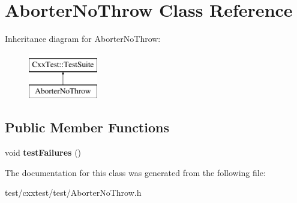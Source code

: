 \hypertarget{classAborterNoThrow}{\section{Aborter\-No\-Throw Class Reference}
\label{classAborterNoThrow}
}
Inheritance diagram for Aborter\-No\-Throw\-:\begin{figure}[H]
\begin{center}
\leavevmode
\includegraphics[height=2.000000cm]{classAborterNoThrow}
\end{center}
\end{figure}
\subsection*{Public Member Functions}
\begin{DoxyCompactItemize}
\item 
\hypertarget{classAborterNoThrow_a7abfaf7cdbde6d2858e060b44f0a1583}{void {\bfseries test\-Failures} ()}\label{classAborterNoThrow_a7abfaf7cdbde6d2858e060b44f0a1583}

\end{DoxyCompactItemize}


The documentation for this class was generated from the following file\-:\begin{DoxyCompactItemize}
\item 
test/cxxtest/test/Aborter\-No\-Throw.\-h\end{DoxyCompactItemize}
